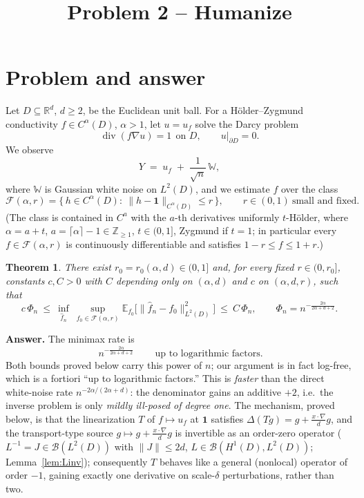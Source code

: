 \documentclass[11pt]{article}
\newtheorem{theorem}{Theorem}[section]
\theoremstyle{remark}
\newcommand{\R}{\mathbb{R}}
\newcommand{\E}{\mathbb{E}}
\newcommand{\F}{\mathcal{F}}
\newcommand{\W}{\mathbb{W}}
\newcommand{\one}{\mathbf{1}}
\newcommand{\norm}[1]{\lVert #1\rVert}
\newcommand{\SET}[1]{\{#1\}}
\DeclareMathOperator{\diver}{div}
\begin{document}
\title{Problem 2 -- Humanize}
\author{}
\date{}
\maketitle


\section{Problem and answer}

Let $D\subseteq\R^{d}$, $d\ge2$, be the Euclidean unit ball. For a
H\"older--Zygmund conductivity $f\in C^{\alpha}(D)$, $\alpha>1$, let
$u=u_{f}$ solve the Darcy problem
\[
\diver(f\nabla u)=1\ \ \text{on }D,\qquad u|_{\partial D}=0 .
\]
We observe
\[
Y\;=\;u_{f}\;+\;\frac{1}{\sqrt{n}}\,\W ,
\]
where $\W$ is Gaussian white noise on $L^{2}(D)$, and we estimate $f$ over
the class
\[
\F(\alpha,r)=\SET{\,h\in C^{\alpha}(D):\ \norm{h-\one}_{C^{\alpha}(D)}\le r\,},
\qquad r\in(0,1)\ \text{small and fixed}.
\]
(The class is contained in $C^{a}$ with the $a$-th derivatives uniformly
$t$-H\"older, where $\alpha=a+t$, $a=\lceil\alpha\rceil-1\in\mathbb Z_{\ge1}$,
$t\in(0,1]$, Zygmund if $t=1$; in particular every $f\in\F(\alpha,r)$ is
continuously differentiable and satisfies $1-r\le f\le1+r$.)

\begin{theorem}\label{thm:main}
There exist $r_{0}=r_{0}(\alpha,d)\in(0,1]$ and, for every fixed
$r\in(0,r_{0}]$, constants $c,C>0$ with $C$ depending only on
$(\alpha,d)$ and $c$ on $(\alpha,d,r)$, such that
\[
c\,\Phi_{n}
\ \le\
\inf_{\widehat f_{n}}\ \sup_{f_{0}\in\F(\alpha,r)}
\E_{f_{0}}\!\bigl[\norm{\widehat f_{n}-f_{0}}_{L^{2}(D)}^{2}\bigr]
\ \le\ C\,\Phi_{n},
\qquad
\Phi_{n}=n^{-\frac{2\alpha}{2\alpha+d+2}} .
\]
\end{theorem}

\noindent\textbf{Answer.} The minimax rate is
\[
\boxed{\ n^{-\frac{2\alpha}{2\alpha+d+2}}\ }
\qquad\text{up to logarithmic factors.}
\]
Both bounds proved below carry this power of $n$; our argument is in fact
log-free, which is a fortiori ``up to logarithmic factors.'' This is
\emph{faster} than the
direct white-noise rate $n^{-2\alpha/(2\alpha+d)}$: the denominator gains
an additive $+2$, i.e.\ the inverse problem is only \emph{mildly ill-posed
of degree one}. The mechanism, proved below, is that the linearization $T$
of $f\mapsto u_{f}$ at $\one$ satisfies $\Delta(Tg)=g+\frac{x\cdot\nabla}{d}g$,
and the transport-type source $g\mapsto g+\frac{x\cdot\nabla}{d}g$ is
invertible as an order-zero operator ($L^{-1}=J\in\mathcal B(L^{2}(D))$ with
$\norm{J}\le2d$, $L\in\mathcal B(H^{1}(D),L^{2}(D))$;
Lemma~\ref{lem:Linv}); consequently $T$
behaves like a general (nonlocal) operator of order $-1$, gaining exactly
one derivative on scale-$\delta$ perturbations, rather than two.
\end{document}

